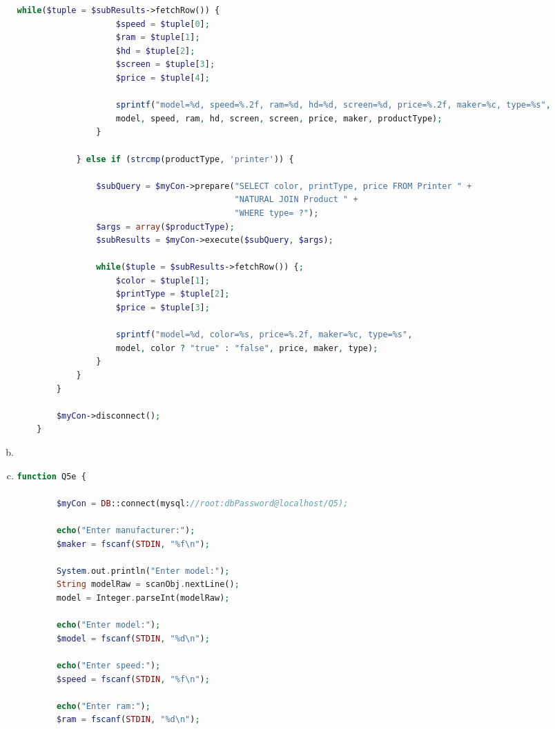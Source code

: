 \documentclass[12pt]{article}
\begin{document}
\begin{enumerate}[1.]
\begin{enumerate}[a)]
\begin{lstlisting}[language=PHP]
                while($tuple = $subResults->fetchRow()) {
                    $speed = $tuple[0];
                    $ram = $tuple[1];
                    $hd = $tuple[2];
                    $screen = $tuple[3];
                    $price = $tuple[4];

                    sprintf("model=%d, speed=%.2f, ram=%d, hd=%d, screen=%d, price=%.2f, maker=%c, type=%s",
                    model, speed, ram, hd, screen, screen, price, maker, productType);
                }

            } else if (strcmp(productType, 'printer')) {

                $subQuery = $myCon->prepare("SELECT color, printType, price FROM Printer " +
                                            "NATURAL JOIN Product " +
                                            "WHERE type= ?");
                $args = array($productType);
                $subResults = $myCon->execute($subQuery, $args);

                while($tuple = $subResults->fetchRow()) {;
                    $color = $tuple[1];
                    $printType = $tuple[2];
                    $price = $tuple[3];

                    sprintf("model=%d, color=%s, price=%.2f, maker=%c, type=%s",
                    model, color ? "true" : "false", price, maker, type);
                }
            }
        }

        $myCon->disconnect();
    }
    \end{lstlisting}

        \item

        \item

    \begin{lstlisting}[language=PHP]
    function Q5e {

        $myCon = DB::connect(mysql://root:dbPassword@localhost/Q5);

        echo("Enter manufacturer:");
        $maker = fscanf(STDIN, "%f\n");

        System.out.println("Enter model:");
        String modelRaw = scanObj.nextLine();
        model = Integer.parseInt(modelRaw);

        echo("Enter model:");
        $model = fscanf(STDIN, "%d\n");

        echo("Enter speed:");
        $speed = fscanf(STDIN, "%f\n");

        echo("Enter ram:");
        $ram = fscanf(STDIN, "%d\n");


\end{lstlisting}
\end{enumerate}
\end{enumerate}
\end{document}
